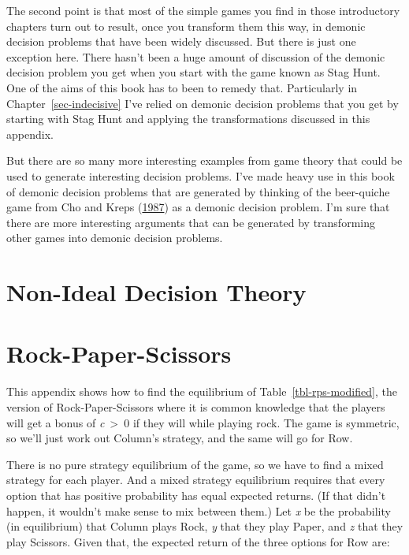 \documentclass[
  12pt,
  letterpaper,
  DIV=11,
  numbers=noendperiod]{scrreprt}
\begin{document}
The second point is that most of the simple games you find in those
introductory chapters turn out to result, once you transform them this
way, in demonic decision problems that have been widely discussed. But
there is just one exception here. There hasn't been a huge amount of
discussion of the demonic decision problem you get when you start with
the game known as Stag Hunt. One of the aims of this book has to been to
remedy that. Particularly in Chapter~\ref{sec-indecisive} I've relied on
demonic decision problems that you get by starting with Stag Hunt and
applying the transformations discussed in this appendix.

But there are so many more interesting examples from game theory that
could be used to generate interesting decision problems. I've made heavy
use in this book of demonic decision problems that are generated by
thinking of the beer-quiche game from Cho and Kreps
(\protect\hyperlink{ref-ChoKreps1987}{1987}) as a demonic decision
problem. I'm sure that there are more interesting arguments that can be
generated by transforming other games into demonic decision problems.

\hypertarget{sec-nidt}{%
\chapter{Non-Ideal Decision Theory}\label{sec-nidt}}

\hypertarget{sec-rps}{%
\chapter{Rock-Paper-Scissors}\label{sec-rps}}

This appendix shows how to find the equilibrium of
Table~\ref{tbl-rps-modified}, the version of Rock-Paper-Scissors where
it is common knowledge that the players will get a bonus of
\emph{c}~\textgreater~0 if they will while playing rock. The game is
symmetric, so we'll just work out Column's strategy, and the same will
go for Row.

There is no pure strategy equilibrium of the game, so we have to find a
mixed strategy for each player. And a mixed strategy equilibrium
requires that every option that has positive probability has equal
expected returns. (If that didn't happen, it wouldn't make sense to mix
between them.) Let \emph{x} be the probability (in equilibrium) that
Column plays Rock, \emph{y} that they play Paper, and \emph{z} that they
play Scissors. Given that, the expected return of the three options for
Row are:
\end{document}

